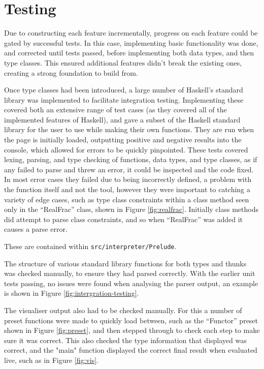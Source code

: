 \section{Testing} \label{testing}
Due to constructing each feature incrementally, progress on each feature could be gated by successful tests. In this case, implementing basic functionality was done, and corrected until tests passed, before implementing both data types, and then type classes. This ensured additional features didn't break the existing ones, creating a strong foundation to build from.

Once type classes had been introduced, a large number of Haskell's standard library was implemented to facilitate integration testing. Implementing these covered both an extensive range of test cases (as they covered all of the implemented features of Haskell), and gave a subset of the Haskell standard library for the user to use while making their own functions. They are run when the page is initially loaded, outputting positive and negative results into the console, which allowed for errors to be quickly pinpointed. These tests covered lexing, parsing, and type checking of functions, data types, and type classes, as if any failed to parse and threw an error, it could be inspected and the code fixed. In most error cases they failed due to being incorrectly defined, a problem with the function itself and not the tool, however they were important to catching a variety of edge cases, such as type class constraints within a class method seen only in the ``RealFrac'' class, shown in Figure \ref{fig:realfrac}. Initially class methods did attempt to parse class constraints, and so when ``RealFrac'' was added it causes a parse error.

These are contained within \texttt{src/interpreter/Prelude}.

The structure of various standard library functions for both types and thunks was checked manually, to ensure they had parsed correctly. With the earlier unit tests passing, no issues were found when analysing the parser output, an example is shown in Figure \ref{fig:intergration-testing}.


The visualiser output also had to be checked manually. For this a number of preset functions were made to quickly load between, such as the ``Functor'' preset shown in Figure \ref{fig:preset}, and then stepped through to check each step to make sure it was correct. This also checked the type information that displayed was correct, and the "main" function displayed the correct final result when evaluated live, such as in Figure \ref{fig:vis}.

